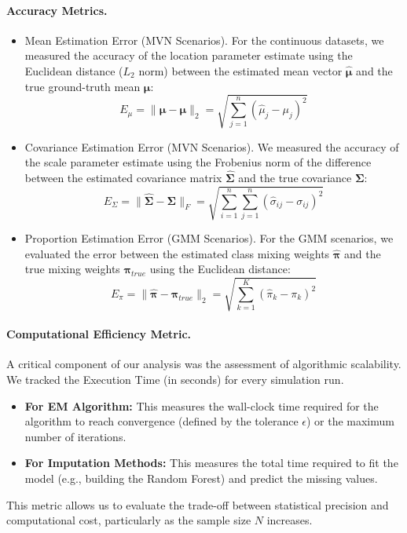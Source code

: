 \documentclass[11pt, a4paper]{article}
\begin{document}
\paragraph{Accuracy Metrics.}
\begin{itemize}
    \item  Mean Estimation Error (MVN Scenarios).
    For the continuous datasets, we measured the accuracy of the location parameter estimate using the Euclidean distance ($L_2$ norm) between the estimated mean vector $\hat{\boldsymbol{\mu}}$ and the true ground-truth mean $\boldsymbol{\mu}$:
    \begin{equation}
     E_{\mu} = \|
    \hat{\boldsymbol{\mu}} - \boldsymbol{\mu} \|_2 = \sqrt{\sum_{j=1}^n (\hat{\mu}_j - \mu_j)^2}
    \end{equation}
    \item Covariance Estimation Error (MVN Scenarios).
    We measured the accuracy of the scale parameter estimate using the Frobenius norm of the difference between the estimated covariance matrix $\hat{\boldsymbol{\Sigma}}$ and the true covariance $\boldsymbol{\Sigma}$:
    \begin{equation}
     E_{\Sigma} = \|
    \hat{\boldsymbol{\Sigma}} - \boldsymbol{\Sigma} \|_F = \sqrt{\sum_{i=1}^n \sum_{j=1}^n (\hat{\sigma}_{ij} - \sigma_{ij})^2}
    \end{equation}
    \item Proportion Estimation Error (GMM Scenarios).
    For the GMM scenarios, we evaluated the error between the estimated class mixing weights $\hat{\boldsymbol{\pi}}$ and the true mixing weights $\boldsymbol{\pi}_{true}$ using the Euclidean distance:
    \begin{equation}
        E_{\pi} = \|
    \hat{\boldsymbol{\pi}} - \boldsymbol{\pi}_{true} \|_2 = \sqrt{\sum_{k=1}^K (\hat{\pi}_k - \pi_k)^2}
    \end{equation}
\end{itemize}




\paragraph{Computational Efficiency Metric.}
A critical component of our analysis was the assessment of algorithmic scalability.
We tracked the Execution Time (in seconds) for every simulation run.
\begin{itemize}
    \item \textbf{For EM Algorithm:} This measures the wall-clock time required for the algorithm to reach convergence (defined by the tolerance $\epsilon$) or the maximum number of iterations.
    \item \textbf{For Imputation Methods:} This measures the total time required to fit the model (e.g., building the Random Forest) and predict the missing values.
\end{itemize}
This metric allows us to evaluate the trade-off between statistical precision and computational cost, particularly as the sample size $N$ increases.
\end{document}
